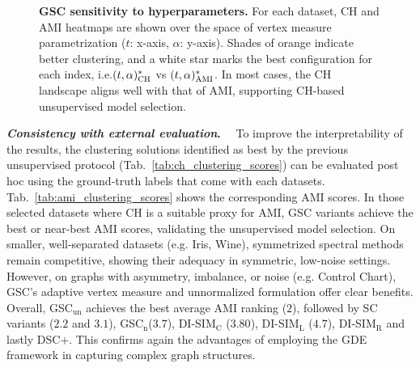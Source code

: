 \documentclass[10pt]{article} %
\makeatletter
\newcommand{\GSC}{GSC\xspace}
\newcommand{\GSCn}{GSC$_{\text{n}}$\xspace}
\newcommand{\GSCun}{GSC$_{\text{un}}$\xspace}
\newcommand{\inlinetitle}[2]{\noindent\textbf{\textit{#1}{#2}}~~}
\newcommand{\ie}   			{i.e.\@\xspace}
\newcommand{\eg}   			{e.g.\@\xspace}
\makeatother
\begin{document}
%
\begin{figure}[t]
  \centering
  \captionsetup[subfigure]{labelformat=parens, justification=centering}



  \hspace{0.66\textwidth} %
  \caption{\textbf{\GSC sensitivity to hyperparameters.} For each dataset, CH and AMI heatmaps are shown over the space of vertex measure parametrization ($t$: x-axis, $\alpha$: y-axis). Shades of orange indicate better clustering, and a white star marks the best configuration for each index, \ie $(t,\alpha)^*_{\textsc{CH}}$ vs $(t,\alpha)^*_{\textsc{AMI}}$. In most cases, the CH landscape aligns well with that of AMI, supporting CH-based unsupervised model selection.}
  \label{fig:heatmaps_sensitivity}
\end{figure}

%

\inlinetitle{Consistency with external evaluation}{.}%
To improve the interpretability of the results, the clustering solutions identified as best by the previous unsupervised protocol (Tab.~\ref{tab:ch_clustering_scores}) can be evaluated post hoc using the ground-truth labels that come with each datasets. Tab.~\ref{tab:ami_clustering_scores} shows the corresponding AMI scores. In those selected datasets where CH is a suitable proxy for AMI, \GSC variants achieve the best or near-best AMI scores, validating the unsupervised model selection. On smaller, well-separated datasets (\eg Iris, Wine), symmetrized spectral methods remain competitive, showing their adequacy in symmetric, low-noise settings. However, on graphs with asymmetry, imbalance, or noise (\eg Control Chart), GSC's adaptive vertex measure and unnormalized formulation offer clear benefits. Overall, \GSCun achieves the best average AMI ranking ($2$), followed by SC variants ($2.2$ and $3.1$), \GSCn ($3.7$), DI-SIM$_{\text{C}}$ ($3.80$), DI-SIM$_{\text{L}}$ ($4.7$), DI-SIM$_{\text{R}}$ and lastly DSC$+$. This confirms again the advantages of employing the GDE framework in capturing complex graph structures.
\end{document}
